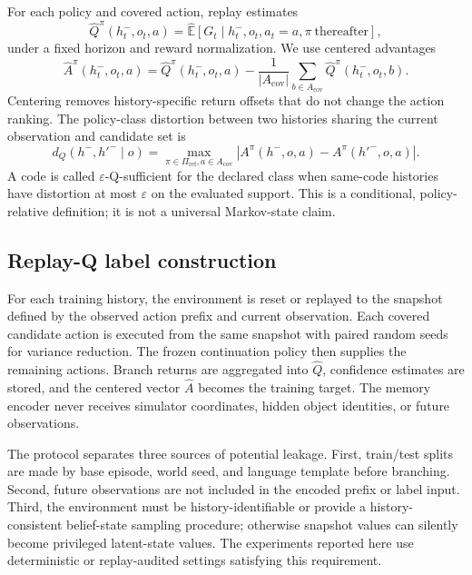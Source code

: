 \documentclass[11pt]{article}
\begin{document}
For each policy and covered action, replay estimates
\begin{equation}
\widehat Q^\pi(h_t^-,o_t,a)=\widehat{\mathbb E}[G_t\mid h_t^-,o_t,a_t=a,\pi\ \mathrm{thereafter}],
\end{equation}
under a fixed horizon and reward normalization. We use centered advantages
\begin{equation}
\widehat A^\pi(h_t^-,o_t,a)=\widehat Q^\pi(h_t^-,o_t,a)-
\frac{1}{|A_{\mathrm{cov}}|}\sum_{b\in A_{\mathrm{cov}}}\widehat Q^\pi(h_t^-,o_t,b).
\end{equation}
Centering removes history-specific return offsets that do not change the action ranking. The policy-class distortion between two histories sharing the current observation and candidate set is
\begin{equation}
d_Q(h^-,h'^-\mid o)=\max_{\pi\in\Pi_{\mathrm{ref}},a\in A_{\mathrm{cov}}}
\left|A^\pi(h^-,o,a)-A^\pi(h'^-,o,a)\right|.
\end{equation}
A code is called $\varepsilon$-Q-sufficient for the declared class when same-code histories have distortion at most $\varepsilon$ on the evaluated support. This is a conditional, policy-relative definition; it is not a universal Markov-state claim.

\subsection{Replay-Q label construction}
For each training history, the environment is reset or replayed to the snapshot defined by the observed action prefix and current observation. Each covered candidate action is executed from the same snapshot with paired random seeds for variance reduction. The frozen continuation policy then supplies the remaining actions. Branch returns are aggregated into $\widehat Q$, confidence estimates are stored, and the centered vector $\widehat A$ becomes the training target. The memory encoder never receives simulator coordinates, hidden object identities, or future observations.

The protocol separates three sources of potential leakage. First, train/test splits are made by base episode, world seed, and language template before branching. Second, future observations are not included in the encoded prefix or label input. Third, the environment must be history-identifiable or provide a history-consistent belief-state sampling procedure; otherwise snapshot values can silently become privileged latent-state values. The experiments reported here use deterministic or replay-audited settings satisfying this requirement.
\end{document}
